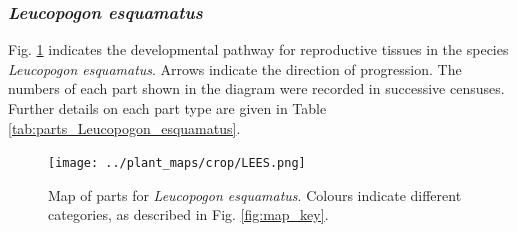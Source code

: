 \documentclass[10pt,twoside]{article}\usepackage[]{graphicx}\usepackage[]{color}
\begin{document}
\clearpage


\subsubsection{\emph{Leucopogon esquamatus}}

Fig. \ref{fig:map_Leucopogon_esquamatus} indicates the developmental pathway for reproductive tissues in the species \emph{Leucopogon esquamatus}. Arrows indicate the direction of progression.  The numbers of each part shown in the diagram were recorded in successive censuses. Further details on each part type are given in Table \ref{tab:parts_Leucopogon_esquamatus}.


\begin{figure}[h]
\centering
\texttt{[image: ../plant\_maps/crop/LEES.png]}
\caption{Map of parts for \emph{Leucopogon esquamatus}. Colours indicate different categories, as described in Fig. \ref{fig:map_key}.}
\label{fig:map_Leucopogon_esquamatus}
\end{figure}
\end{document}
